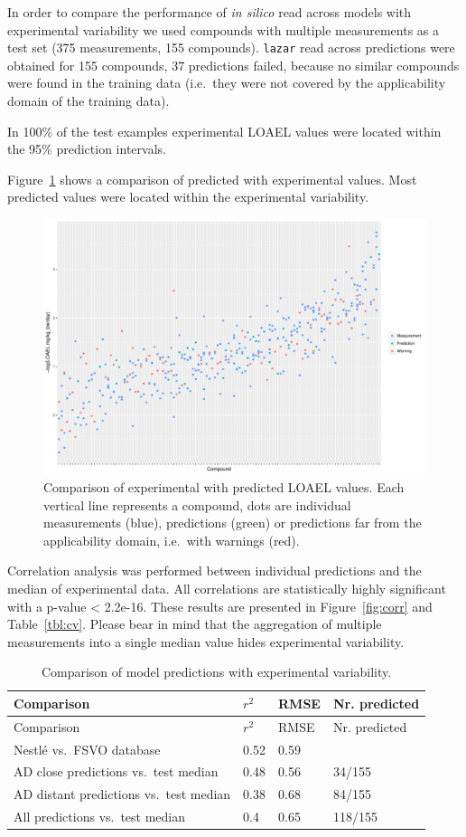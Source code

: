 \documentclass[]{achemso}
\begin{document}
In order to compare the performance of \emph{in silico} read across
models with experimental variability we used compounds with multiple
measurements as a test set (375 measurements, 155 compounds).
\texttt{lazar} read across predictions were obtained for 155 compounds,
37 predictions failed, because no similar compounds were found in the
training data (i.e.~they were not covered by the applicability domain of
the training data).

In 100\% of the test examples experimental LOAEL values were located
within the 95\% prediction intervals.

Figure~\ref{fig:comp} shows a comparison of predicted with experimental
values. Most predicted values were located within the experimental
variability.

\begin{figure}
\centering
\includegraphics{figures/test-prediction.pdf}
\caption{Comparison of experimental with predicted LOAEL values. Each
vertical line represents a compound, dots are individual measurements
(blue), predictions (green) or predictions far from the applicability
domain, i.e.~with warnings (red).}\label{fig:comp}
\end{figure}

Correlation analysis was performed between individual predictions and
the median of experimental data. All correlations are statistically
highly significant with a p-value \textless{} 2.2e-16. These results are
presented in Figure~\ref{fig:corr} and Table~\ref{tbl:cv}. Please bear
in mind that the aggregation of multiple measurements into a single
median value hides experimental variability.

\hypertarget{tbl:common-pred}{}
\begin{longtable}[]{@{}llll@{}}
\caption{\label{tbl:common-pred}Comparison of model predictions with
experimental variability. }\tabularnewline
\toprule
Comparison & \(r^2\) & RMSE & Nr. predicted\tabularnewline
\midrule
\endfirsthead
\toprule
Comparison & \(r^2\) & RMSE & Nr. predicted\tabularnewline
\midrule
\endhead
Nestlé vs.~FSVO database & 0.52 & 0.59\tabularnewline
AD close predictions vs.~test median & 0.48 & 0.56 &
34/155\tabularnewline
AD distant predictions vs.~test median & 0.38 & 0.68 &
84/155\tabularnewline
All predictions vs.~test median & 0.4 & 0.65 & 118/155\tabularnewline
\bottomrule
\end{longtable}
\end{document}
